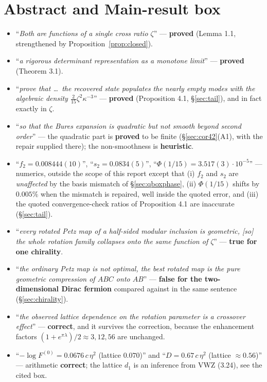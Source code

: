 \documentclass[11pt]{article}
\begin{document}
\section{Abstract and Main-result box}\label{sec:abstract}
\begin{itemize}
\item ``\emph{Both are functions of a single cross ratio $\zeta$}'' --- \textbf{proved}
(Lemma 1.1, strengthened by Proposition~\ref{prop:closed}).
\item ``\emph{a rigorous determinant representation as a monotone limit}'' --- \textbf{proved}
(Theorem 3.1).
\item ``\emph{prove that \dots\ the recovered state populates the nearly empty modes with the
algebraic density $\tfrac2{15}\zeta^2\kappa^{-3}$}'' --- \textbf{proved}
(Proposition 4.1, \S\ref{sec:tail}), and in fact exactly in $\zeta$.
\item ``\emph{so that the Bures expansion is quadratic but not smooth beyond second order}'' ---
the quadratic part is \textbf{proved} to be finite (\S\ref{sec:cor42}(A1), with the repair
supplied there); the non-smoothness is \textbf{heuristic}.
\item ``$f_2=0.008444(10)$'', ``$s_2=0.0834(5)$'', ``$\Phi(1/15)=3.517(3)\cdot10^{-5}$'' ---
numerics, outside the scope of this report except that (i) $f_2$ and $s_2$ are \emph{unaffected}
by the basis mismatch of \S\ref{sec:qboxphase}, (ii) $\Phi(1/15)$ shifts by $0.005\%$ when the
mismatch is repaired, well inside the quoted error, and (iii) the quoted convergence-check ratios
of Proposition 4.1 are inaccurate (\S\ref{sec:tail}).
\item ``\emph{every rotated Petz map of a half-sided modular inclusion is geometric, [so] the whole
rotation family collapses onto the same function of $\zeta$}'' --- \textbf{true for one chirality}.
\item ``\emph{the ordinary Petz map is not optimal, the best rotated map is the pure geometric
compression of $ABC$ onto $AB$}'' --- \textbf{false for the two-dimensional Dirac fermion}
compared against in the same sentence (\S\ref{sec:chirality}).
\item ``\emph{the observed lattice dependence on the rotation parameter is a crossover effect}'' ---
\textbf{correct}, and it survives the correction, because the enhancement factors
$(1+e^{\pi\lambda})/2\approx3,12,56$ are unchanged.
\item ``$-\log F^{(0)}=0.0676\,c\,\eta^2$ (lattice $0.070$)'' and ``$D=0.67\,c\,\eta^2$
(lattice $\approx0.56$)'' --- arithmetic \textbf{correct}; the lattice $d_1$ is an inference from
VWZ (3.24), see the cited box.
\end{itemize}
\end{document}
